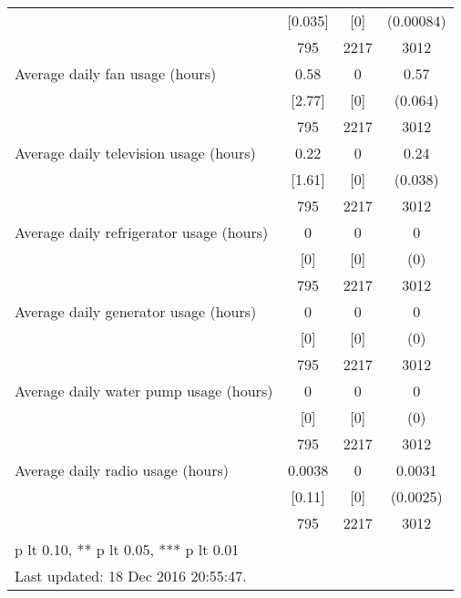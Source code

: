 \begin{table}[htbp]
\begin{tabular*}{0.9\hsize}{@{\hskip\tabcolsep\extracolsep\fill}l*{1}{ccc}}
                                &  [0.035]&      [0]&(0.00084)         \\
                                &      795&     2217&     3012         \\
Average daily fan usage (hours) &     0.58&        0&     0.57\sym{***}\\
                                &   [2.77]&      [0]&  (0.064)         \\
                                &      795&     2217&     3012         \\
Average daily television usage (hours)&     0.22&        0&     0.24\sym{***}\\
                                &   [1.61]&      [0]&  (0.038)         \\
                                &      795&     2217&     3012         \\
Average daily refrigerator usage (hours)&        0&        0&        0         \\
                                &      [0]&      [0]&      (0)         \\
                                &      795&     2217&     3012         \\
Average daily generator usage (hours)&        0&        0&        0         \\
                                &      [0]&      [0]&      (0)         \\
                                &      795&     2217&     3012         \\
Average daily water pump usage (hours)&        0&        0&        0         \\
                                &      [0]&      [0]&      (0)         \\
                                &      795&     2217&     3012         \\
Average daily radio usage (hours)&   0.0038&        0&   0.0031         \\
                                &   [0.11]&      [0]& (0.0025)         \\
                                &      795&     2217&     3012         \\
\bottomrule
\multicolumn{4}{l}{\footnotesize * p lt 0.10, ** p lt 0.05, *** p lt 0.01}\\
\multicolumn{4}{l}{\footnotesize Last updated: 18 Dec 2016 20:55:47.}\\
\end{tabular*}
\end{table}
